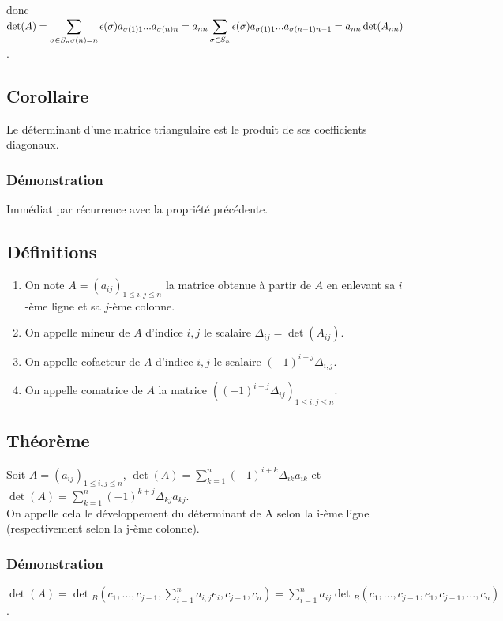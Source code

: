 \documentclass[a4paper,10pt]{book} %
\newcommand{\displayAmath}{\displaystyle}
\begin{document}
donc $\displayAmath\det(A)=\sum_{\sigma\in S_n\\ \sigma(n)=n}\epsilon(\sigma)a_{\sigma(1)1}...a_{\sigma(n)n}=a_{nn}\sum_{\sigma\in S_n}\epsilon(\sigma)a_{\sigma(1)1}...a_{\sigma(n-1)n-1}=a_{nn}\det(A_{nn})$.

\subsection{Corollaire}
Le déterminant d'une matrice triangulaire est le produit de ses coefficients diagonaux.

\subsubsection{Démonstration}
Immédiat par récurrence avec la propriété précédente.

\subsection{Définitions}
\begin{enumerate}
\item On note $A=(a_{ij})_{1\leq i,j\leq n}$ la matrice obtenue à partir de $A$ en enlevant sa $i$-ème ligne et sa $j$-ème colonne.
\item On appelle mineur de $A$ d'indice $i,j$ le scalaire $\Delta_{ij}=\det(A_{ij})$.
\item On appelle cofacteur de $A$ d'indice $i,j$ le scalaire $(-1)^{i+j}\Delta_{i,j}$.
\item On appelle comatrice de $A$ la matrice $((-1)^{i+j}\Delta_{ij})_{1\leq i,j\leq n}$.
\end{enumerate}

\subsection{Théorème}
Soit $\displayAmath A=(a_{ij})_{1\leq i,j\leq n}$, $\displayAmath\det(A)=\sum_{k=1}^n(-1)^{i+k}\Delta_{ik}a_{ik}$ et $\displayAmath\det(A)=\sum_{k=1}^n(-1)^{k+j}\Delta_{kj}a_{kj}$.\\

On appelle cela le développement du déterminant de A selon la i-ème ligne (respectivement selon la j-ème colonne).

\subsubsection{Démonstration}
$\displayAmath\det(A)=\det{}_B(c_1,...,c_{j-1},\sum_{i=1}^na_{i,j}e_i,c_{j+1},c_n)= \sum_{i=1}^na_{ij}\det{}_B(c_1,...,c_{j-1},e_1,c_{j+1},...,c_n)$.\\
\end{document}

